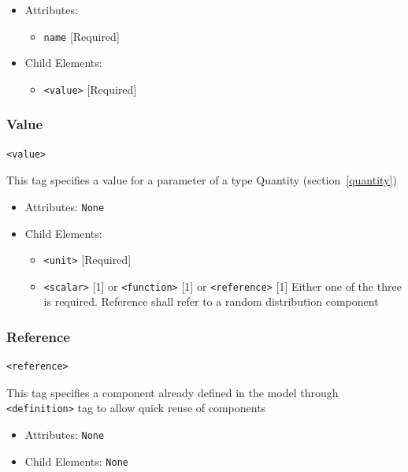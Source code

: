 \documentclass{article}
\begin{document}
\begin{itemize}
\item Attributes:
%
\begin{itemize}
\item \verb|name| {[}Required{]}
\end{itemize}


\item Child Elements:
%
\begin{itemize}
\item \verb|<value>| {[}Required{]}
\end{itemize}

\end{itemize}

\subsubsection{Value}
%
\begin{lstlisting}
<value>
\end{lstlisting}

This tag specifies a value for a parameter of a type Quantity
(section~\ref{quantity})

\begin{itemize}
\item Attributes: \texttt{None}

\item Child Elements:
%
\begin{itemize}
\item \verb|<unit>| {[}Required{]}
\item \verb|<scalar>| {[}1{]} or \verb|<function>| {[}1{]} or
\verb|<reference>| {[}1{]} Either one of the three is required. Reference
shall refer to a random distribution component
\end{itemize}

\end{itemize}

\subsubsection{Reference}
%
\begin{lstlisting}
<reference>
\end{lstlisting}

This tag specifies a component already defined in the model through
\verb|<definition>| tag to allow quick reuse of components

\begin{itemize}
\item Attributes: \texttt{None}

\item Child Elements: \texttt{None}

\end{itemize}
\end{document}
